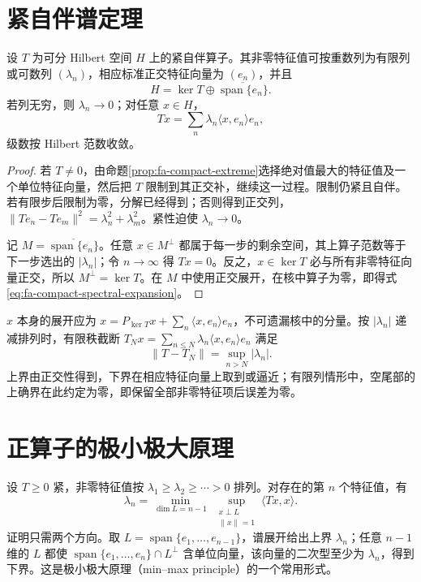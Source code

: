 \documentclass[UTF8,12pt,a4paper,fontset=fandol]{ctexbook}
\begin{document}
\section{紧自伴谱定理}
\begin{theorem}\label{thm:fa-compact-spectral}
设 $T$ 为可分 Hilbert 空间 $H$ 上的紧自伴算子。其非零特征值可按重数列为有限列或可数列 $(\lambda_n)$，相应标准正交特征向量为 $(e_n)$，并且
\[
 H=\ker T\oplus\overline{\operatorname{span}\{e_n\}}.
\]
若列无穷，则 $\lambda_n\to0$；对任意 $x\in H$，
\begin{equation}
 Tx=\sum_n\lambda_n\langle x,e_n\rangle e_n,
 \label{eq:fa-compact-spectral-expansion}
\end{equation}
级数按 Hilbert 范数收敛。
\end{theorem}
\begin{proof}
若 $T\ne0$，由命题\ref{prop:fa-compact-extreme}选择绝对值最大的特征值及一个单位特征向量，然后把 $T$ 限制到其正交补，继续这一过程。限制仍紧且自伴。若有限步后限制为零，分解已经得到；否则得到正交列，$\|Te_n-Te_m\|^2=\lambda_n^2+\lambda_m^2$。紧性迫使 $\lambda_n\to0$。

记 $M=\overline{\operatorname{span}\{e_n\}}$。任意 $x\in M^\perp$ 都属于每一步的剩余空间，其上算子范数等于下一步选出的 $|\lambda_n|$；令 $n\to\infty$ 得 $Tx=0$。反之，$x\in\ker T$ 必与所有非零特征向量正交，所以 $M^\perp=\ker T$。在 $M$ 中使用正交展开，在核中算子为零，即得式\eqref{eq:fa-compact-spectral-expansion}。
\end{proof}
$x$ 本身的展开应为 $x=P_{\ker T}x+\sum_n\langle x,e_n\rangle e_n$，不可遗漏核中的分量。按 $|\lambda_n|$ 递减排列时，有限秩截断 $T_Nx=\sum_{n\leq N}\lambda_n\langle x,e_n\rangle e_n$ 满足
\[
 \|T-T_N\|=\sup_{n>N}|\lambda_n|.
\]
上界由正交性得到，下界在相应特征向量上取到或逼近；有限列情形中，空尾部的上确界在此约定为零，即保留全部非零特征项后误差为零。

\section{正算子的极小极大原理}
设 $T\geq0$ 紧，非零特征值按 $\lambda_1\geq\lambda_2\geq\cdots>0$ 排列。对存在的第 $n$ 个特征值，有
\[
 \lambda_n=\min_{\dim L=n-1}\ \sup_{\substack{x\perp L\\\|x\|=1}}
 \langle Tx,x\rangle.
\]
证明只需两个方向。取 $L=\operatorname{span}\{e_1,\ldots,e_{n-1}\}$，谱展开给出上界 $\lambda_n$；任意 $n-1$ 维的 $L$ 都使 $\operatorname{span}\{e_1,\ldots,e_n\}\cap L^\perp$ 含单位向量，该向量的二次型至少为 $\lambda_n$，得到下界。这是极小极大原理（min--max principle）的一个常用形式。
\end{document}
